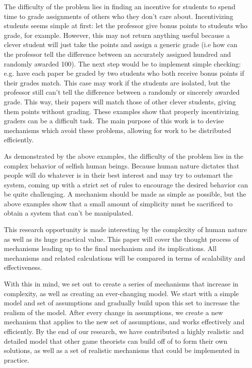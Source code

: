 \documentclass[12pt, Arial]{article}
\begin{document}
The difficulty of the problem lies in finding an incentive for students to spend time to grade assignments of others who they don't care about. Incentivizing students seems simple at first: let the professor give bonus points to students who grade, for example. However, this may not return anything useful because a clever student will just take the points and assign a generic grade (i.e how can the professor tell the difference between an accurately assigned hundred and randomly awarded 100). The next step would be to implement simple checking: e.g. have each paper be graded by two students who both receive bonus points if their grades match. This case may work if the students are isolated, but the professor still can't tell the difference between a randomly or sincerely awarded grade. This way, their papers will match those of other clever students, giving them points without grading. These examples show that properly incentivizing graders can be a difficult task. The main purpose of this work is to devise mechanisms which avoid these problems, allowing for work to be distributed efficiently.

As demonstrated by the above examples, the difficulty of the problem lies in the complex behavior of selfish human beings. Because human nature dictates that people will do whatever is in their best interest and may try to outsmart the system, coming up with a strict set of rules to encourage the desired behavior can be quite challenging. A mechanism should be made as simple as possible, but the above examples show that a small amount of simplicity must be sacrificed to obtain a system that can't be manipulated.

This research opportunity is made interesting by the complexity of human nature as well as its huge practical value. This paper will cover the thought process of mechanisms leading up to the final mechanism and its implications. All mechanisms and related calculations will be compared in terms of scalability and effectiveness.

With this in mind, we set out to create a series of mechanisms that increase in complexity, as well as creating an ever-changing model. We start with a simple model and set of assumptions and gradually build upon this set to increase the realism of the model. After every change in assumptions, we create a new mechanism that applies to the new set of assumptions, and works effectively and efficiently. By the end of our research, we have contributed a highly realistic and detailed model that other game theorists can build off of to form their own solutions, as well as a set of realistic mechanisms that could be implemented in practice.
\end{document}
